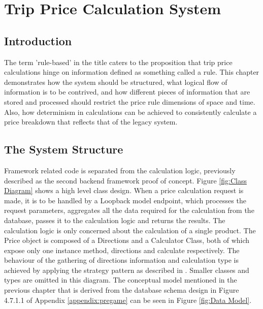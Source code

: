 \graphicspath{{Chapter4/Figs/Vector/}{Chapter4/Figs/}}

\chapter{Trip Price Calculation System}
\section{Introduction}
The term 'rule-based' in the title caters to the proposition that trip price calculations hinge on information defined as something called a rule. This chapter demonstrates how the system should be structured, what logical flow of information is to be contrived, and how different pieces of information that are stored and processed should restrict the price rule dimensions of space and time. Also, how determinism in calculations can be achieved to consistently calculate a price breakdown that reflects that of the legacy system.

\section{The System Structure}
Framework related code is separated from the calculation logic, previously described as the second backend framework proof of concept. Figure \ref{fig:Class Diagram} shows a high level class design. When a price calculation request is made, it is to be handled by a Loopback model endpoint, which processes the request parameters, aggregates all the data required for the calculation from the database, passes it to the calculation logic and returns the results. The calculation logic is only concerned about the calculation of a single product. The Price object is composed of a Directions and a Calculator Class, both of which expose only one instance method, directions and calculate respectively. The behaviour of the gathering of directions information and calculation type is achieved by applying the strategy pattern as described in \cite{gof}. Smaller classes and types are omitted in this diagram. The conceptual model mentioned in the previous chapter that is derived from the database schema design in Figure 4.7.1.1 of Appendix \ref{appendix:pregame} can be seen in Figure \ref{fig:Data Model}.

